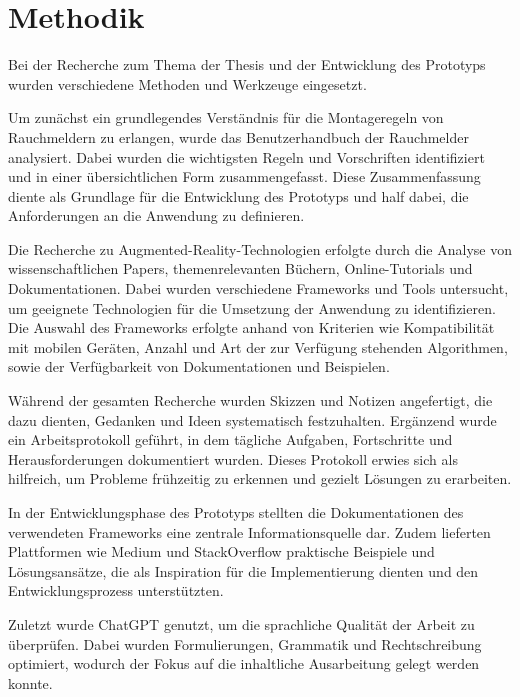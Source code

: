 \chapter{Methodik}

Bei der Recherche zum Thema der Thesis und der Entwicklung des Prototyps wurden verschiedene Methoden und Werkzeuge eingesetzt.

Um zunächst ein grundlegendes Verständnis für die Montageregeln von Rauchmeldern zu erlangen, wurde das Benutzerhandbuch der Rauchmelder analysiert. Dabei wurden die wichtigsten Regeln und Vorschriften identifiziert und in einer übersichtlichen Form zusammengefasst. Diese Zusammenfassung diente als Grundlage für die Entwicklung des Prototyps und half dabei, die Anforderungen an die Anwendung zu definieren.

Die Recherche zu Augmented-Reality-Technologien erfolgte durch die Analyse von wissenschaftlichen Papers, themenrelevanten Büchern, Online-Tutorials und Dokumentationen. Dabei wurden verschiedene Frameworks und Tools untersucht, um geeignete Technologien für die Umsetzung der Anwendung zu identifizieren. Die Auswahl des Frameworks erfolgte anhand von Kriterien wie Kompatibilität mit mobilen Geräten, Anzahl und Art der zur Verfügung stehenden Algorithmen, sowie der Verfügbarkeit von Dokumentationen und Beispielen.

Während der gesamten Recherche wurden Skizzen und Notizen angefertigt, die dazu dienten, Gedanken und Ideen systematisch festzuhalten. Ergänzend wurde ein Arbeitsprotokoll geführt, in dem tägliche Aufgaben, Fortschritte und Herausforderungen dokumentiert wurden. Dieses Protokoll erwies sich als hilfreich, um Probleme frühzeitig zu erkennen und gezielt Lösungen zu erarbeiten.

In der Entwicklungsphase des Prototyps stellten die Dokumentationen des verwendeten Frameworks eine zentrale Informationsquelle dar. Zudem lieferten Plattformen wie Medium und StackOverflow praktische Beispiele und Lösungsansätze, die als Inspiration für die Implementierung dienten und den Entwicklungsprozess unterstützten.

Zuletzt wurde ChatGPT genutzt, um die sprachliche Qualität der Arbeit zu überprüfen. Dabei wurden Formulierungen, Grammatik und Rechtschreibung optimiert, wodurch der Fokus auf die inhaltliche Ausarbeitung gelegt werden konnte.
